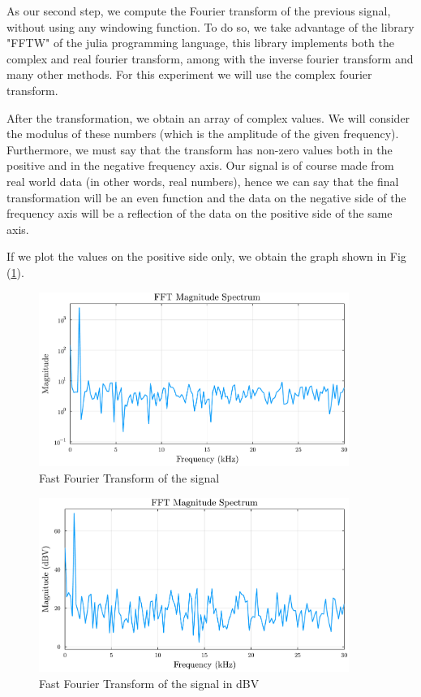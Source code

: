 \documentclass[a4paper,12pt]{article}
\begin{document}
\par As our second step, we compute the Fourier transform of the previous signal, 
without using any windowing function. To do so, we take advantage of the library
"FFTW" of the julia programming language, this library implements both the
complex and real fourier transform, among with the inverse fourier transform 
and many other methods. For this experiment we will use the complex fourier transform.

\par After the transformation, we obtain an array of complex values. We will consider the
modulus of these numbers (which is the amplitude of the given frequency). Furthermore, 
we must say that the transform has non-zero values both in the positive and in the 
negative frequency axis. Our signal is of course made from real world data 
(in other words, real numbers), hence we can say that the final transformation will 
be an even function and the data on the negative side of the frequency axis will be 
a reflection of the data on the positive side of the same axis.

\par If we plot the values on the positive side only, we obtain the graph shown in 
Fig (\ref{plot:Fourier_signal}).
\begin{figure}[H]
    \centering
    \includegraphics[width=0.9\textwidth]{fft01.pdf}
    \caption{Fast Fourier Transform of the signal}
    \label{plot:Fourier_signal}
\end{figure}
\begin{figure}[H]
    \centering
    \includegraphics[width=0.9\textwidth]{fft01_dBV.pdf}
    \caption{Fast Fourier Transform of the signal in dBV}
    \label{plot:Fourier_signal_dBV}
\end{figure}
\end{document}
